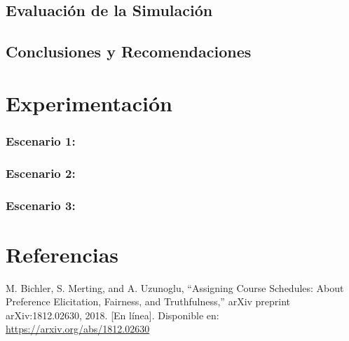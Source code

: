 \documentclass{article}
\begin{document}
\subsection{Evaluación de la Simulación}


\subsection{Conclusiones y Recomendaciones}



\section{Experimentación}\label{sec:exp}

\subsubsection{Escenario 1: }

\subsubsection{Escenario 2: }
 
\subsubsection{Escenario 3: }


\section{Referencias}
\renewcommand{\refname}{}

\begin{thebibliography}{9}

 \label{ref:BPS} M. Bichler, S. Merting, and A. Uzunoglu, 
“Assigning Course Schedules: About Preference Elicitation, Fairness, and Truthfulness,” 
arXiv preprint arXiv:1812.02630, 2018. [En línea]. Disponible en: 
\url{https://arxiv.org/abs/1812.02630}


\end{thebibliography}
\end{document}
